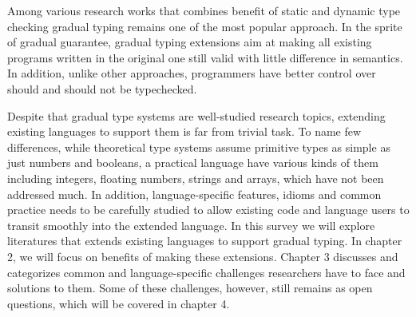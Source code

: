 Among various research works that combines
benefit of static and dynamic type checking
gradual typing remains one of the most popular approach.
In the sprite of gradual guarantee, gradual typing extensions aim at
making all existing programs written in the original one still valid with little difference in semantics.
In addition, unlike other approaches, programmers have better control over should and should not be typechecked.

Despite that gradual type systems are well-studied research topics,
extending existing languages to support them is far from trivial task.
To name few differences, while theoretical type systems assume primitive types as simple as just numbers and booleans,
a practical language have various kinds of them including integers, floating numbers, strings and arrays,
which have not been addressed much.
In addition, language-specific features, idioms and common practice needs
to be carefully studied to allow existing code and language users to transit smoothly into
the extended language. In this survey we will explore literatures that extends existing languages to support gradual typing.
In chapter 2, we will focus on benefits of making these extensions. Chapter 3 discusses and categorizes common and language-specific
challenges researchers have to face and solutions to them.
Some of these challenges, however, still remains as open questions, which will be covered in chapter 4.

